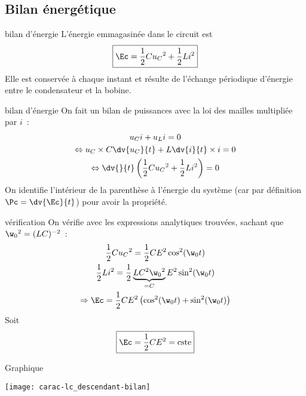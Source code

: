 \documentclass[../main/main.tex]{subfiles}
\begin{document}
\subsection{Bilan énergétique}
\begin{tcbraster}[raster columns=2, raster equal height=rows]
    \begin{prop}[label=prop:lcenerg-décharge]{bilan d'énergie}
        L'énergie emmagasinée dans le circuit est
        \[\boxed{\Ec = \frac{1}{2}Cu_C{}^2 + \frac{1}{2}Li^2}\]
        Elle est conservée à chaque instant et résulte de l'échange périodique
        d'énergie entre le condensateur et la bobine.
    \end{prop}
    \begin{demo}[label=demo:rcenerg-charge]{bilan d'énergie}
        On fait un bilan de puissances avec la loi des mailles multipliée par $i$~:
        \begin{gather*}
            u_Ci + u_Li = 0\\
            \Leftrightarrow u_C\times C \dv{u_C}{t} + L \dv{i}{t}\times i = 0\\
            \Leftrightarrow \dv{}{t} \left( \frac{1}{2}Cu_C{}^2 + \frac{1}{2}Li^2 \right) = 0
        \end{gather*}
        On identifie l'intérieur de la parenthèse à l'énergie du système (car
        par définition $\Pc = \dv{\Ec}{t}$) pour avoir la propriété.
    \end{demo}
    \begin{impl}[label=impl]{vérification}
        On vérifie avec les expressions analytiques trouvées, sachant que
        $\w_0{}^2 = (LC)^{-2}$~:
        \begin{gather*}
            \frac{1}{2}Cu_C{}^2 = \frac{1}{2}CE^2\cos^2(\w_0t)\\
            \frac{1}{2}Li^2 =
            \frac{1}{2}\underbrace{LC^{2}\w_0{}^2}_{=C}E^2\sin^2(\w_0t)\\
            \Rightarrow \Ec = \frac{1}{2}CE^2 \left( \cos^2(\w_0t) +
            \sin^2(\w_0t) \right)
        \end{gather*}
        Soit
        \begin{equation*}
            \boxed{\Ec = \frac{1}{2}CE^2 = \text{cste}}
        \end{equation*}
    \end{impl}
    \begin{NCexem}[width=\linewidth]{Graphique}
        \begin{center}
            \texttt{[image: carac-lc\_descendant-bilan]}
        \end{center}
    \end{NCexem}
\end{tcbraster}
\end{document}
